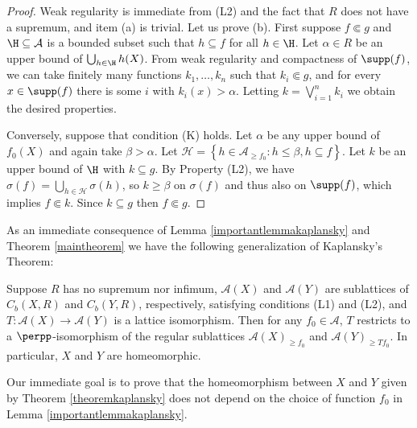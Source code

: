 \begin{proof}
Weak regularity is immediate from (L2) and the fact that $R$ does not have a supremum, and item (a) is trivial. Let us prove (b). First suppose $f\Subset g$ and $\H\subseteq\mathcal{A}$ is a bounded subset such that $h\subseteq f$ for all $h\in \H$. Let $\alpha\in R$ be an upper bound of $\bigcup_{h\in\H}h(X)$. From weak regularity and compactness of $\supp(f)$, we can take finitely many functions $k_1,\ldots,k_n$ such that $k_i\Subset g$, and for every $x\in\supp(f)$ there is some $i$ with $k_i(x)>\alpha$. Letting $k=\bigvee_{i=1}^n k_i$ we obtain the desired properties.

Conversely, suppose that condition (K) holds. Let $\alpha$ be any upper bound of $f_0(X)$ and again take $\beta>\alpha$. Let $\mathscr{H}=\left\{h\in\mathcal{A}_{\geq f_0}:h\leq \beta, h\subseteq f\right\}$. Let $k$ be an upper bound of $\H$ with $k\subseteq g$. By Property (L2), we have $\sigma(f)=\bigcup_{h\in\mathscr{H}}\sigma(h)$, so $k\geq\beta$ on $\sigma(f)$ and thus also on $\supp(f)$, which implies $f\Subset k$. Since $k\subseteq g$ then $f\Subset g$.\qedhere
\end{proof}

As an immediate consequence of Lemma \ref{importantlemmakaplansky} and Theorem \ref{maintheorem} we have the following generalization of Kaplansky's Theorem:

\begin{theorem}\label{theoremkaplansky}
Suppose $R$ has no supremum nor infimum, $\mathcal{A}(X)$ and $\mathcal{A}(Y)$ are sublattices of $C_b(X,R)$ and $C_b(Y,R)$, respectively, satisfying conditions (L1) and (L2), and $T:\mathcal{A}(X)\to\mathcal{A}(Y)$ is a lattice isomorphism. Then for any $f_0\in\mathcal{A}$, $T$ restricts to a $\perpp$-isomorphism of the regular sublattices $\mathcal{A}(X)_{\geq f_0}$ and $\mathcal{A}(Y)_{\geq Tf_0}$. In particular, $X$ and $Y$ are homeomorphic.
\end{theorem}

Our immediate goal is to prove that the homeomorphism between $X$ and $Y$ given by Theorem \ref{theoremkaplansky} does not depend on the choice of function $f_0$ in Lemma \ref{importantlemmakaplansky}.

